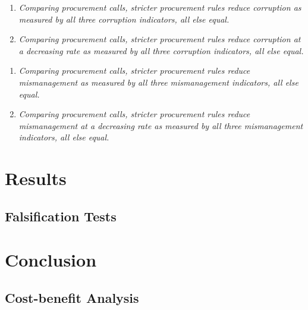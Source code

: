 \documentclass[11pt]{article}
\newcommand{\hypopen}{Comparing procurement calls}
\begin{document}
\begin{enumerate}[label = H\arabic{enumi}:, font = \bfseries, labelindent = \parindent, leftmargin = *, resume] %
  \item \textit{\hypopen, stricter procurement rules reduce corruption as measured by all three corruption indicators, \emph{all else equal}.}
  \item \textit{\hypopen, stricter procurement rules reduce corruption at a decreasing rate as measured by all three corruption indicators, \emph{all else equal}.}
\end{enumerate}

\begin{enumerate}[label = H\arabic{enumi}:, font = \bfseries, labelindent = \parindent, leftmargin = *, resume] %
  \item \textit{\hypopen, stricter procurement rules reduce mismanagement as measured by all three mismanagement indicators, \emph{all else equal}.}
  \item \textit{\hypopen, stricter procurement rules reduce mismanagement at a decreasing rate as measured by all three mismanagement indicators, \emph{all else equal}.}
\end{enumerate}


\section{Results} \label{sec:result}

\subsection{Falsification Tests} \label{subsec:discussion}

\section{Conclusion} \label{sec:conclusion}

\subsection{Cost-benefit Analysis} \label{subsec:cba}


\setlength\bibsep{0pt}



\clearpage


\end{document}
